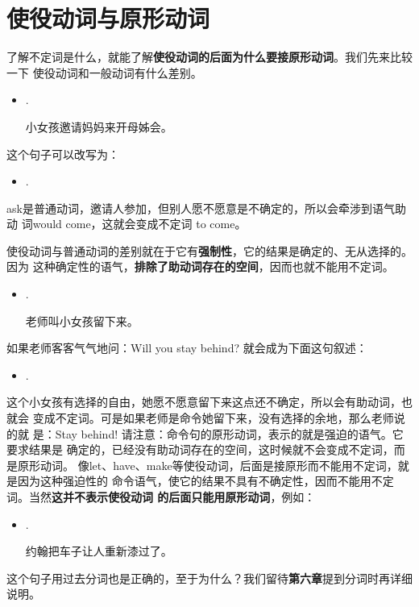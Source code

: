 \section{使役动词与原形动词}

了解不定词是什么，就能了解\textbf{使役动词的后面为什么要接原形动词}。我们先来比较一下
使役动词和一般动词有什么差别。

\begin{itemize}
\item {}   .

  小女孩邀请妈妈来开母姊会。
\end{itemize}

这个句子可以改写为：

\begin{itemize}
\item  {}  .
\end{itemize}

ask是普通动词，邀请人参加，但别人愿不愿意是不确定的，所以会牵涉到语气助动
词would come，这就会变成不定词 to come。

使役动词与普通动词的差别就在于它有\textbf{强制性}，它的结果是确定的、无从选择的。因为
这种确定性的语气，\textbf{排除了助动词存在的空间}，因而也就不能用不定词。

\begin{itemize}
\item  {}   .

  老师叫小女孩留下来。
\end{itemize}

如果老师客客气气地问：Will you stay behind? 就会成为下面这句叙述：
\begin{itemize}
\item {}   .
\end{itemize}
这个小女孩有选择的自由，她愿不愿意留下来这点还不确定，所以会有助动词，也就会
变成不定词。可是如果老师是命令她留下来，没有选择的余地，那么老师说的就
是：Stay behind! 请注意：命令句的原形动词，表示的就是强迫的语气。它要求结果是
确定的，已经没有助动词存在的空间，这时候就不会变成不定词，而是原形动词。
像let、have、make等使役动词，后面是接原形而不能用不定词，就是因为这种强迫性的
命令语气，使它的结果不具有不确定性，因而不能用不定词。当然\textbf{这并不表示使役动词
  的后面只能用原形动词}，例如：
\begin{itemize}
\item {}   .

  约翰把车子让人重新漆过了。
\end{itemize}
这个句子用过去分词也是正确的，至于为什么？我们留待\textbf{第六章}提到分词时再详细说明。


